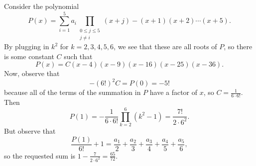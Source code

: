 Consider the polynomial \[P\left(x\right)=\displaystyle\sum_{i=1}^5a_i\displaystyle\prod_{\substack{0\leq j\leq5\\j\neq i}}\left(x+j\right)-\left(x+1\right)\left(x+2\right)\cdots\left(x+5\right).\] By plugging in $k^2$ for $k=2,3,4,5,6$, we see that these are all roots of $P$, so there is some constant $C$ such that \[P\left(x\right)=C\left(x-4\right)\left(x-9\right)\left(x-16\right)\left(x-25\right)\left(x-36\right).\] Now, observe that \[-\left(6!\right)^2C=P\left(0\right)=-5!\] because all of the terms of the summation in $P$ have a factor of $x$, so $C=\frac{1}{6\cdot6!}$. Then \[P\left(1\right)=-\frac{1}{6\cdot6!}\displaystyle\prod_{k=2}^6\left(k^2-1\right)=\frac{7!}{2\cdot6^2}.\] But observe that \[\frac{P\left(1\right)}{6!}+1=\frac{a_1}{2}+\frac{a_2}{3}+\frac{a_3}{4}+\frac{a_4}{5}+\frac{a_5}{6},\] so the requested sum is $1-\frac{7}{2\cdot6^2}=\boxed{\frac{65}{72}}$.